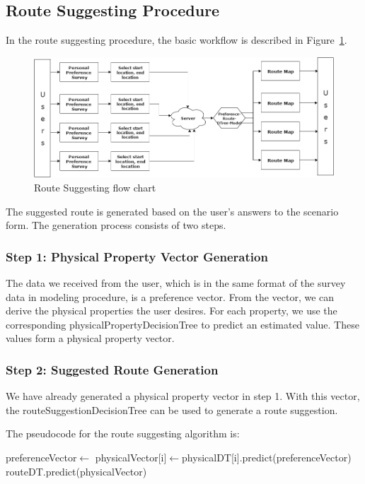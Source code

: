 \documentclass{sigchi}
\begin{document}
\subsection{Route Suggesting Procedure}
In the route suggesting procedure, the basic workflow is described in Figure~\ref{fig:route-suggest-work-flow}.

\begin{figure}[!h]
\centering
\includegraphics[width=1.0\columnwidth]{pics/route-suggest-work-flow.png}
\caption{Route Suggesting flow chart}
\label{fig:route-suggest-work-flow}
\end{figure}

The suggested route is generated based on the user’s answers to the scenario form. The generation process consists of two steps.

\subsubsection{Step 1: Physical Property Vector Generation}
The data we received from the user, which is in the same format of the survey data in modeling procedure,  is a preference vector. From the vector, we can derive the physical properties the user desires. For each property, we use the corresponding physicalPropertyDecisionTree to predict an estimated value. These values form a physical property vector.

\subsubsection{Step 2: Suggested Route Generation}
We have already generated a physical property vector in step 1. With this vector, the routeSuggestionDecisionTree can be used to generate a route suggestion.

The pseudocode for the route suggesting algorithm is:
\begin{algorithmic}\footnotesize
    \State preferenceVector$\gets$
      \State physicalVector[i]$\gets$physicalDT[i].predict(preferenceVector) \EndFor
    \State \Return routeDT.predict(physicalVector)
  \EndFunction
\end{algorithmic}
\end{document}
